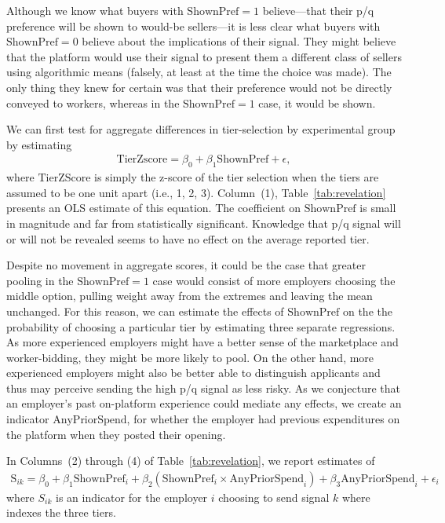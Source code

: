\documentclass[prodmode,acmec]{ec-acmsmall}
\newcommand{\important}[1]{#1}
\begin{document}
Although we know what buyers with $\mbox{ShownPref} = 1$ believe---that their p/q preference will be shown to would-be sellers---it is less clear what buyers with $\mbox{ShownPref} = 0$ believe about the implications of their signal. 
They might believe that the platform would use their signal to present them a different class of sellers using algorithmic means (falsely, at least at the time the choice was made).
The only thing they knew for certain was that their preference would not be directly conveyed to workers, whereas in the $\mbox{ShownPref} = 1$ case, it would be shown. 

We can first test for aggregate differences in tier-selection by experimental group by estimating
\begin{align} \label{eq:tierz} 
  \mbox{TierZscore} = \beta_0 + \beta_1 \mbox{ShownPref} + \epsilon, 
\end{align}
where $\mbox{TierZScore}$ is simply the z-score of the tier selection when the tiers are assumed to be one unit apart (i.e., 1, 2, 3). 
Column~(1), Table~\ref{tab:revelation} presents an OLS estimate of this equation.
The coefficient on $\mbox{ShownPref}$ is small in magnitude and far from statistically significant. 
\important{Knowledge that p/q signal will or will not be revealed seems to have no effect on the average reported tier.}

Despite no movement in aggregate scores, it could be the case that greater pooling in the $\mbox{ShownPref} = 1$ case would consist of more employers choosing the middle option, pulling weight away from the extremes and leaving the mean unchanged.
For this reason, we can estimate the effects of $\mbox{ShownPref}$ on the the probability of choosing a particular tier by estimating three separate regressions.  
As more experienced employers might have a better sense of the marketplace and worker-bidding, they might be more likely to pool.
On the other hand, more experienced employers might also be better able to distinguish applicants and thus may perceive sending the high p/q signal as less risky. 
As we conjecture that an employer's past on-platform experience could mediate any effects, we create an indicator $\mbox{AnyPriorSpend}$, for whether the employer had previous expenditures on the platform when they posted their opening.  

In Columns~(2) through (4) of Table~\ref{tab:revelation}, we report estimates of 
\begin{align} \label{eq:tieri}
\mbox{S}_{ik} = \beta_0 + \beta_1 \mbox{ShownPref}_i + \beta_2 \left( \mbox{ShownPref}_i \times \mbox{AnyPriorSpend}_i \right ) + \beta_3 \mbox{AnyPriorSpend}_i + \epsilon_i
\end{align} 
where $S_{ik}$ is an indicator for the employer $i$ choosing to send signal $k$ where indexes the three tiers. 
\end{document}
